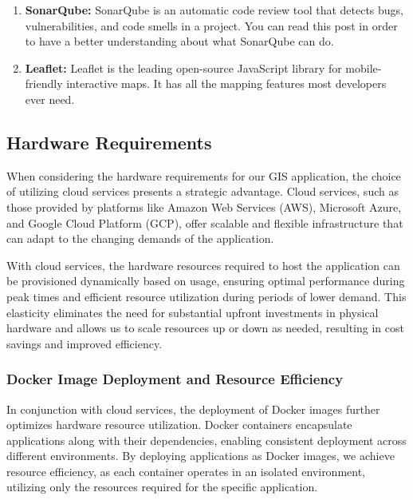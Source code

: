 \begin{enumerate}
\begin{enumerate}
        \item \textbf{SonarQube:} SonarQube is an automatic code review tool that detects bugs, vulnerabilities, and code smells in a project. You can read this post in order to have a better understanding about what SonarQube can do.

        \item \textbf{Leaflet:} Leaflet is the leading open-source JavaScript library for mobile-friendly interactive maps. It has all the mapping features most developers ever need.
    \end{enumerate}

\end{enumerate}


\subsection{Hardware Requirements}\label{subsec:hardware-requirements}
When considering the hardware requirements for our GIS application, the choice of utilizing cloud services presents a strategic advantage. Cloud services, such as those provided by platforms like Amazon Web Services (AWS), Microsoft Azure, and Google Cloud Platform (GCP), offer scalable and flexible infrastructure that can adapt to the changing demands of the application.

With cloud services, the hardware resources required to host the application can be provisioned dynamically based on usage, ensuring optimal performance during peak times and efficient resource utilization during periods of lower demand. This elasticity eliminates the need for substantial upfront investments in physical hardware and allows us to scale resources up or down as needed, resulting in cost savings and improved efficiency.

\subsubsection{Docker Image Deployment and Resource Efficiency}

In conjunction with cloud services, the deployment of Docker images further optimizes hardware resource utilization. Docker containers encapsulate applications along with their dependencies, enabling consistent deployment across different environments. By deploying applications as Docker images, we achieve resource efficiency, as each container operates in an isolated environment, utilizing only the resources required for the specific application. 

